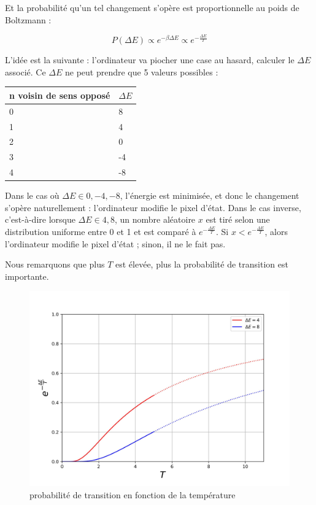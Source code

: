 \documentclass[11pt, parskip=half]{scrartcl} %
\begin{document}
Et la probabilité qu'un tel changement s'opère est proportionnelle au poids de Boltzmann :

\begin{equation*}
	P(\Delta E) \propto e^{-\beta \Delta E} \propto e^{-\frac{\Delta E}{T}}
\end{equation*}

L'idée est la suivante : l'ordinateur va piocher une case au hasard, calculer le $\Delta E$ associé. Ce $\Delta E$ ne peut prendre que 5 valeurs possibles :

\begin{center}
	\begin{tabular}{|l|m{4cm}|}
		\hline
		n voisin de sens opposé & $\Delta E $ \\
		\hline
		0                       & 8           \\
		1                       & 4           \\
		2                       & 0           \\
		3                       & -4          \\
		4                       & -8          \\\hline
	\end{tabular}
\end{center}

\vspace{4mm}

Dans le cas où $\Delta E \in {0, -4, -8}$, l'énergie est minimisée, et donc le changement s'opère naturellement : l'ordinateur modifie le pixel d'état. Dans le cas inverse, c'est-à-dire lorsque $\Delta E \in {4, 8}$, un nombre aléatoire $x$ est tiré selon une distribution uniforme entre 0 et 1 et est comparé à $e^{-\frac{\Delta E}{T}}$. Si $x < e^{-\frac{\Delta E}{T}}$, alors l'ordinateur modifie le pixel d'état ; sinon, il ne le fait pas.

Nous remarquons que plus $T$ est élevée, plus la probabilité de transition est importante.

\begin{figure}[h]
	\centering
	\includegraphics[width=0.5\linewidth]{./figures/proba.jpg}
	\caption{probabilité de transition en fonction de la température}
	\label{fig:H}
\end{figure}
\end{document}
